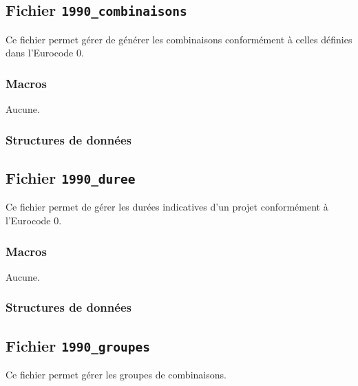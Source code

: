 \documentclass{article}
\begin{document}
\subsection{Fichier {\texttt{1990\_combinaisons}}}
Ce fichier permet gérer de générer les combinaisons conformément à celles définies dans l'Eurocode 0.
\subsubsection{Macros}
Aucune.
\subsubsection{Structures de données}













\subsection{Fichier {\texttt{1990\_duree}}}
Ce fichier permet de gérer les durées indicatives d'un projet conformément à l'Eurocode 0.
\subsubsection{Macros}
Aucune.
\subsubsection{Structures de données}












\subsection{Fichier {\texttt{1990\_groupes}}}
Ce fichier permet gérer les groupes de combinaisons.
\end{document}
